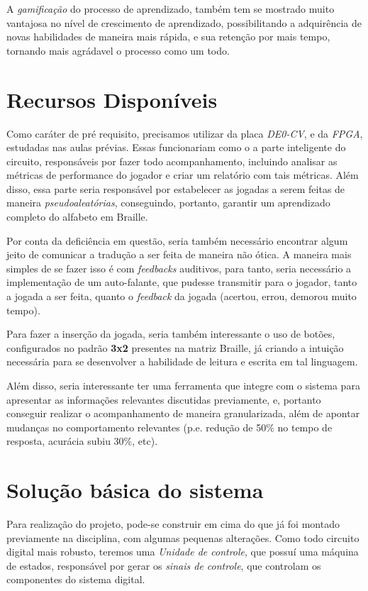 \documentclass[amsmath,amssymb,floatfix]{report}
\begin{document}
A \textit{gamificação} do processo de aprendizado, também tem se mostrado muito vantajosa no nível de crescimento de aprendizado, possibilitando a adquirência de novas habilidades de maneira mais rápida, e sua retenção por mais tempo, tornando mais agrádavel o processo como um todo.
\section{Recursos Disponíveis}
Como caráter de pré requisito, precisamos utilizar da placa \textit{DE0-CV}, e da \textit{FPGA}, estudadas nas aulas prévias. Essas funcionariam como o a parte inteligente do circuito, responsáveis por fazer todo acompanhamento, incluindo analisar as métricas de performance do jogador e criar um relatório com tais métricas. Além disso, essa parte seria responsável por estabelecer as jogadas a serem feitas de maneira \textit{pseudoaleatórias}, conseguindo, portanto, garantir um aprendizado completo do alfabeto em Braille. 

Por conta da deficiência em questão, seria também necessário encontrar algum jeito de comunicar a tradução a ser feita de maneira não ótica. A maneira mais simples de se fazer isso é com \textit{feedbacks} auditivos, para tanto, seria necessário a implementação de um auto-falante, que pudesse transmitir para o jogador, tanto a jogada a ser feita, quanto o \textit{feedback} da jogada (acertou, errou, demorou muito tempo).

Para fazer a inserção da jogada, seria também interessante o uso de botões, configurados no padrão \textbf{3x2} presentes na matriz Braille, já criando a intuição necessária para se desenvolver a habilidade de leitura e escrita em tal linguagem.

Além disso, seria interessante ter uma ferramenta que integre com o sistema para apresentar as informações relevantes discutidas previamente, e, portanto conseguir realizar o acompanhamento de maneira granularizada, além de apontar mudanças no comportamento relevantes (p.e. redução de 50\% no tempo de resposta, acurácia subiu 30\%, etc).

\section{Solução básica do sistema}
Para realização do projeto, pode-se construir em cima do que já foi montado previamente na disciplina, com algumas pequenas alterações. Como todo circuito digital mais robusto, teremos uma \textit{Unidade de controle}, que possuí uma máquina de estados, responsável por gerar os \textit{sinais de controle}, que controlam os componentes do sistema digital. 
\end{document}
